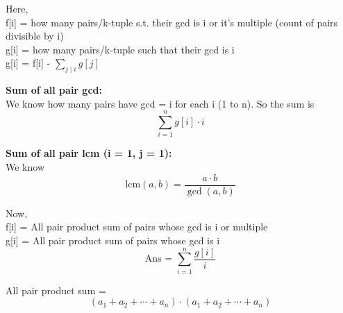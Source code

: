 Here, \\
f[i] = how many pairs/k-tuple s.t. their gcd is i or it’s multiple (count of pairs divisible by i) \\ 
g[i] = how many pairs/k-tuple such that their gcd is i \\ 
g[i] = f[i] - \(\sum_{j \mid i} g[j]\) \\

\medskip

\textbf{Sum of all pair gcd:} \\

We know how many pairs have gcd = i for each i (1 to n). So the sum is  
\[
\sum_{i=1}^{n} g[i] \cdot i
\]

\medskip

\textbf{Sum of all pair lcm (i = 1, j = 1):} \\

We know 
\[
\text{lcm}(a, b) = \frac{a \cdot b}{\gcd(a,b)}
\]

Now, \\

f[i] = All pair product sum of pairs whose gcd is i or multiple \\ 
g[i] = All pair product sum of pairs whose gcd is i \\

\[
\text{Ans = } \sum_{i=1}^{n} \frac{g[i]}{i}
\]

\medskip

All pair product sum = 
\[
(a_1 + a_2 + \cdots + a_n) \cdot (a_1 + a_2 + \cdots + a_n)
\]
